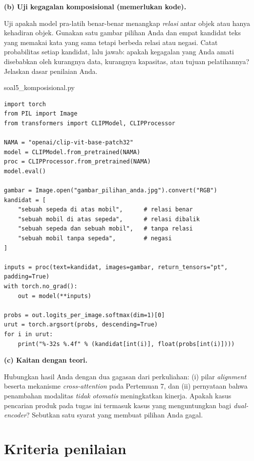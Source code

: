 \documentclass[12pt, a4paper]{article}
\begin{document}
\textbf{(b) Uji kegagalan komposisional (memerlukan kode).}

Uji apakah model pra-latih benar-benar menangkap \emph{relasi} antar objek atau hanya
kehadiran objek. Gunakan satu gambar pilihan Anda dan empat kandidat teks yang memakai
kata yang sama tetapi berbeda relasi atau negasi. Catat probabilitas setiap kandidat,
lalu jawab: apakah kegagalan yang Anda amati disebabkan oleh kurangnya data, kurangnya
kapasitas, atau tujuan pelatihannya? Jelaskan dasar penilaian Anda.

\begin{codewindow}{soal5\_komposisional.py}
\begin{lstlisting}[style=pycode]
import torch
from PIL import Image
from transformers import CLIPModel, CLIPProcessor

NAMA = "openai/clip-vit-base-patch32"
model = CLIPModel.from_pretrained(NAMA)
proc = CLIPProcessor.from_pretrained(NAMA)
model.eval()

gambar = Image.open("gambar_pilihan_anda.jpg").convert("RGB")
kandidat = [
    "sebuah sepeda di atas mobil",      # relasi benar
    "sebuah mobil di atas sepeda",      # relasi dibalik
    "sebuah sepeda dan sebuah mobil",   # tanpa relasi
    "sebuah mobil tanpa sepeda",        # negasi
]

inputs = proc(text=kandidat, images=gambar, return_tensors="pt", padding=True)
with torch.no_grad():
    out = model(**inputs)

probs = out.logits_per_image.softmax(dim=1)[0]
urut = torch.argsort(probs, descending=True)
for i in urut:
    print("%-32s %.4f" % (kandidat[int(i)], float(probs[int(i)])))
\end{lstlisting}
\end{codewindow}

\textbf{(c) Kaitan dengan teori.}

Hubungkan hasil Anda dengan dua gagasan dari perkuliahan: (i) pilar \emph{alignment}
beserta mekanisme \emph{cross-attention} pada Pertemuan 7, dan (ii) pernyataan bahwa
penambahan modalitas \emph{tidak otomatis} meningkatkan kinerja. Apakah kasus pencarian
produk pada tugas ini termasuk kasus yang menguntungkan bagi \emph{dual-encoder}?
Sebutkan satu syarat yang membuat pilihan Anda gagal.

\clearpage
\section{Kriteria penilaian}\label{sec:evaluation}
\end{document}
